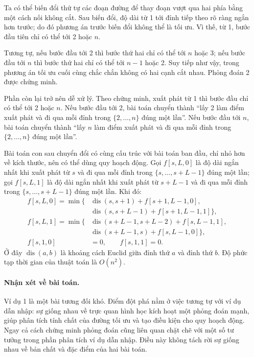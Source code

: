 \documentclass[11pt]{article}
\begin{document}
Ta có thể biến đổi thứ tự các đoạn đường để thay đoạn vượt qua hai phía bằng
một cách nối không cắt. Sau biến đổi, độ dài từ 1 tới đỉnh tiếp theo rõ ràng
ngắn hơn trước; do đó phương án trước biến đổi không thể là tối ưu. Vì thế,
từ 1, bước đầu tiên chỉ có thể tới 2 hoặc \(n\).

Tương tự, nếu bước đầu tới 2 thì bước thứ hai chỉ có thể tới \(n\) hoặc 3; nếu
bước đầu tới \(n\) thì bước thứ hai chỉ có thể tới \(n-1\) hoặc 2. Suy tiếp
như vậy, trong phương án tối ưu cuối cùng chắc chắn không có hai cạnh cắt
nhau. Phỏng đoán 2 được chứng minh.

Phần còn lại trở nên dễ xử lý. Theo chứng minh, xuất phát từ 1 thì bước đầu
chỉ có thể tới 2 hoặc \(n\). Nếu bước đầu tới 2, bài toán chuyển thành
``lấy 2 làm điểm xuất phát và đi qua mỗi đỉnh trong \(\{2,\ldots,n\}\) đúng
một lần''. Nếu bước đầu tới \(n\), bài toán chuyển thành ``lấy \(n\) làm điểm
xuất phát và đi qua mỗi đỉnh trong \(\{2,\ldots,n\}\) đúng một lần''.

Bài toán con sau chuyển đổi có cùng cấu trúc với bài toán ban đầu, chỉ nhỏ
hơn về kích thước, nên có thể dùng quy hoạch động. Gọi \(f[s,L,0]\) là độ dài
ngắn nhất khi xuất phát từ \(s\) và đi qua mỗi đỉnh trong
\(\{s,\ldots,s+L-1\}\) đúng một lần; gọi \(f[s,L,1]\) là độ dài ngắn nhất khi
xuất phát từ \(s+L-1\) và đi qua mỗi đỉnh trong \(\{s,\ldots,s+L-1\}\) đúng
một lần. Khi đó:
\[
\begin{aligned}
f[s,L,0]=\min\{&
  \operatorname{dis}(s,s+1)+f[s+1,L-1,0],\\
& \operatorname{dis}(s,s+L-1)+f[s+1,L-1,1]\},\\
f[s,L,1]=\min\{&
  \operatorname{dis}(s+L-1,s+L-2)+f[s,L-1,1],\\
& \operatorname{dis}(s+L-1,s)+f[s,L-1,0]\},\\
f[s,1,0]&=0,\qquad f[s,1,1]=0.
\end{aligned}
\]
Ở đây \(\operatorname{dis}(a,b)\) là khoảng cách Euclid giữa đỉnh thứ \(a\)
và đỉnh thứ \(b\). Độ phức tạp thời gian của thuật toán là \(O(n^2)\).

\paragraph{Nhận xét về bài toán.}
Ví dụ 1 là một bài tương đối khó. Điểm đột phá nằm ở việc tương tự với ví dụ
dẫn nhập: sự giống nhau về trực quan hình học kích hoạt một phỏng đoán mạnh,
giúp phân tích tính chất của đường tối ưu và tạo điều kiện cho quy hoạch
động. Ngay cả cách chứng minh phỏng đoán cũng liên quan chặt chẽ với một số
tư tưởng trong phần phân tích ví dụ dẫn nhập. Điều này không tách rời sự
giống nhau về bản chất và đặc điểm của hai bài toán.
\end{document}
